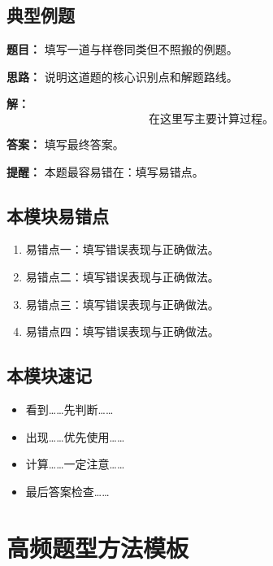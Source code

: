 \documentclass[UTF8,zihao=-4]{ctexart}
\begin{document}
\subsection{典型例题}

\begin{examplebox}[典型例题]
\textbf{题目：}
填写一道与样卷同类但不照搬的例题。

\textbf{思路：}
说明这道题的核心识别点和解题路线。

\textbf{解：}
\[
\text{在这里写主要计算过程。}
\]

\textbf{答案：}
填写最终答案。

\textbf{提醒：}
本题最容易错在：填写易错点。
\end{examplebox}

\subsection{本模块易错点}

\begin{warnbox}[本模块易错点]
\begin{enumerate}
  \item 易错点一：填写错误表现与正确做法。
  \item 易错点二：填写错误表现与正确做法。
  \item 易错点三：填写错误表现与正确做法。
  \item 易错点四：填写错误表现与正确做法。
\end{enumerate}
\end{warnbox}

\subsection{本模块速记}

\begin{keybox}[本模块速记]
\begin{itemize}
  \item 看到……先判断……
  \item 出现……优先使用……
  \item 计算……一定注意……
  \item 最后答案检查……
\end{itemize}
\end{keybox}

\section{高频题型方法模板}
\end{document}
